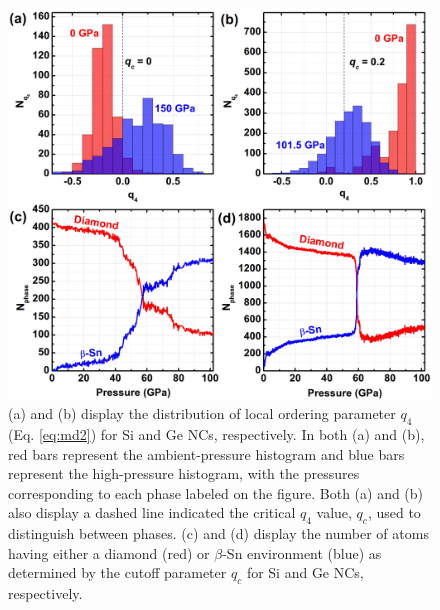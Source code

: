 \begin{figure}
\begin{center}
\includegraphics[width=\textwidth]{./chapter7/md4.png}
\caption[Analysis of NC coordination environment using an ordering parameter and pressure-dependent crystal phase populations during MD simulations of pressurization.]{(a) and (b) display the distribution of local ordering parameter $q_4$ (Eq. \ref{eq:md2}) for Si and Ge NCs, respectively. In both (a) and (b), red bars represent the ambient-pressure histogram and blue bars represent the high-pressure histogram, with the pressures corresponding to each phase labeled on the figure. Both (a) and (b) also display a dashed line indicated the critical $q_4$ value, $q_c$, used to distinguish between phases. (c) and (d) display the number of atoms having either a diamond (red) or $\beta$-Sn environment (blue) as determined by the cutoff parameter $q_c$ for Si and Ge NCs, respectively.}
\label{f:md4}
\end{center}
\end{figure}

